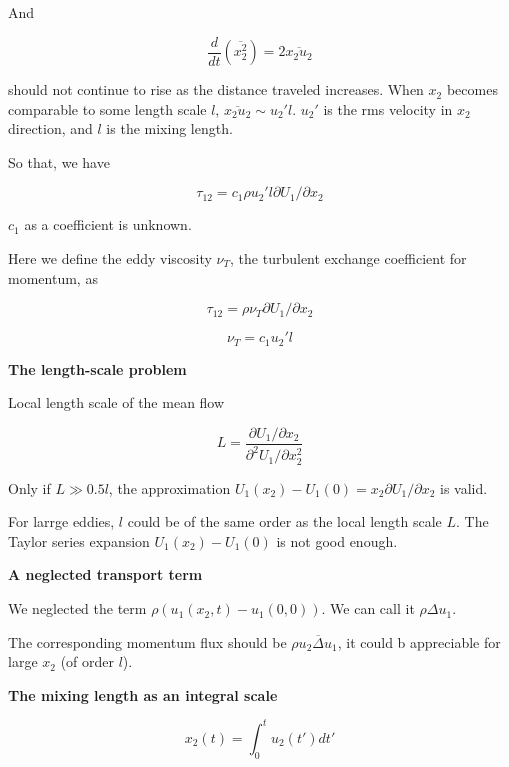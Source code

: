 \documentclass{article}
\begin{document}
And

\begin{equation*}
    \frac{d}{dt}\left(\overline{x_2^2}\right)=2\overline{x_2u_2}
\end{equation*}

should not continue to rise as the distance traveled increases. When $x_2$ becomes comparable to some length scale $l$, $\overline{x_2u_2}\sim u_2'l$. $u_2'$ is the rms velocity in $x_2$ direction, and $l$ is the mixing length.

So that, we have

\begin{equation*}
    \tau_{12}=c_1\rho u_2' l \partial U_1/\partial x_2
\end{equation*}

$c_1$ as a coefficient is unknown.

Here we define the eddy viscosity $\nu_T$, the turbulent exchange coefficient for momentum, as

\begin{equation*}
    \tau_{12}=\rho\nu_T\partial U_1/\partial x_2
\end{equation*}

\begin{equation*}
    \nu_T=c_1u_2'l
\end{equation*}

\textbf{The length-scale problem}

Local length scale of the mean flow

\begin{equation*}
    L=\frac{\partial U_1/\partial x_2}{\partial^2 U_1/\partial x_2^2}
\end{equation*}

Only if $L\gg 0.5l$, the approximation $U_1(x_2)-U_1(0)=x_2\partial U_1/\partial x_2$ is valid.

For larrge eddies, $l$ could be of the same order as the local length scale $L$. The Taylor series expansion $U_1(x_2)-U_1(0)$ is not good enough.

\textbf{A neglected transport term}

We neglected the term $\rho\left(u_1(x_2,t)-u_1(0,0)\right)$. We can call it $\rho\Delta u_1$.

The corresponding momentum flux should be $\rho\overline{u_2\Delta u_1}$, it could b appreciable for large $x_2$ (of order $l$).

\textbf{The mixing length as an integral scale}

\begin{equation*}
    x_2(t)=\int_0^t u_2(t')dt'
\end{equation*}
\end{document}
